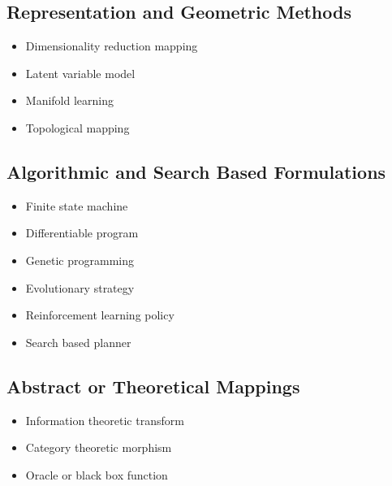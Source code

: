 \documentclass{article}
\begin{document}
\subsection*{Representation and Geometric Methods}
\begin{itemize}
\item Dimensionality reduction mapping
\item Latent variable model
\item Manifold learning
\item Topological mapping
\end{itemize}

\subsection*{Algorithmic and Search Based Formulations}
\begin{itemize}
\item Finite state machine
\item Differentiable program
\item Genetic programming
\item Evolutionary strategy
\item Reinforcement learning policy
\item Search based planner
\end{itemize}

\subsection*{Abstract or Theoretical Mappings}
\begin{itemize}
\item Information theoretic transform
\item Category theoretic morphism
\item Oracle or black box function
\end{itemize}
\end{document}
